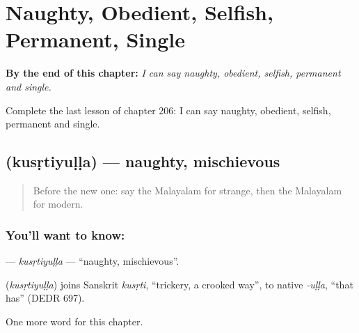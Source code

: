 
\chapter{Naughty, Obedient, Selfish, Permanent, Single}
\label{ch:ml-naughty-obedient-selfish-permanent-single}

\begin{chapteropening}
\textbf{By the end of this chapter:} \emph{I can say naughty, obedient, selfish, permanent and single.}

Complete the last lesson of chapter 206: I can say naughty, obedient, selfish, permanent and single.
\end{chapteropening}

\section[\texorpdfstring{\ml{കുസൃതിയുള്ള} (kusṛtiyuḷḷa)}{കുസൃതിയുള്ള (kusṛtiyuḷḷa)}]{ (kusṛtiyuḷḷa) — naughty, mischievous}

\label{lesson:ML-C206-kusrtiyulla}



\begin{quote}
Before the new one: say the Malayalam for strange, then the Malayalam for modern.
\end{quote}

\subsection*{You'll want to know: }
\textbf{} — \emph{kusṛtiyuḷḷa} — \textquotedblleft{}naughty, mischievous\textquotedblright{}.

\begin{cousinweb}
\textbf{} (\emph{kusṛtiyuḷḷa}) joins Sanskrit \emph{kusṛti}, \textquotedblleft{}trickery, a crooked way\textquotedblright{}, to native \emph{-uḷḷa}, \textquotedblleft{}that has\textquotedblright{} (DEDR 697).
\end{cousinweb}

\begin{grammarlens}[title={What you've built}]
One more word for this chapter.
\end{grammarlens}

